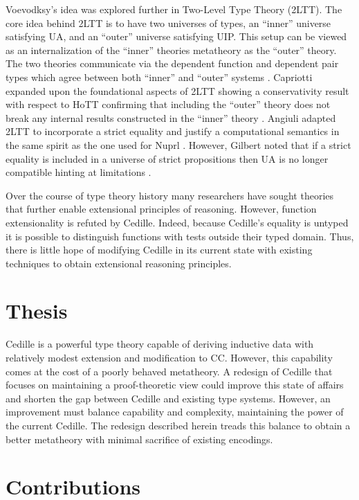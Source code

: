 Voevodksy's idea was explored further in Two-Level Type Theory (2LTT).
The core idea behind 2LTT is to have two universes of types, an ``inner'' universe satisfying UA, and an ``outer'' universe satisfying UIP.
This setup can be viewed as an internalization of the ``inner'' theories metatheory as the ``outer'' theory.
The two theories communicate via the dependent function and dependent pair types which agree between both ``inner'' and ``outer'' systems \cite{annenkov2017}.
Capriotti expanded upon the foundational aspects of 2LTT showing a conservativity result with respect to HoTT confirming that including the ``outer'' theory does not break any internal results constructed in the ``inner'' theory \cite{capriotti2017}.
Angiuli adapted 2LTT to incorporate a strict equality and justify a computational semantics in the same spirit as the one used for Nuprl \cite{angiuli2019}.
However, Gilbert noted that if a strict equality is included in a universe of strict propositions then UA is no longer compatible hinting at limitations \cite{gilbert2019}.

Over the course of type theory history many researchers have sought theories that further enable extensional principles of reasoning.
However, function extensionality is refuted by Cedille.
Indeed, because Cedille's equality is untyped it is possible to distinguish functions with tests outside their typed domain.
Thus, there is little hope of modifying Cedille in its current state with existing techniques to obtain extensional reasoning principles.

\section{Thesis}

Cedille is a powerful type theory capable of deriving inductive data with relatively modest extension and modification to CC.
However, this capability comes at the cost of a poorly behaved metatheory.
A redesign of Cedille that focuses on maintaining a proof-theoretic view could improve this state of affairs and shorten the gap between Cedille and existing type systems.
However, an improvement must balance capability and complexity, maintaining the power of the current Cedille.
The redesign described herein treads this balance to obtain a better metatheory with minimal sacrifice of existing encodings.

\section{Contributions}

